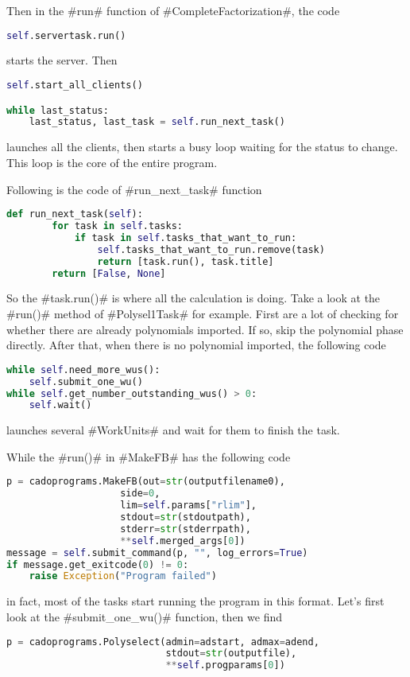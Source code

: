 \documentclass[a4paper]{article}
\begin{document}
Then in the #run# function of #CompleteFactorization#,
the code
\begin{lstlisting}[language=python]
self.servertask.run()
\end{lstlisting}
starts the server.
Then
\begin{lstlisting}[language=python]
self.start_all_clients()

while last_status:
    last_status, last_task = self.run_next_task()
\end{lstlisting}
launches all the clients, then starts a busy loop waiting for the status to change.
This loop is the core of the entire program.

Following is the code of #run_next_task# function
\begin{lstlisting}[language=python]
    def run_next_task(self):
        for task in self.tasks:
            if task in self.tasks_that_want_to_run:
                self.tasks_that_want_to_run.remove(task)
                return [task.run(), task.title]
        return [False, None]
\end{lstlisting}

So the #task.run()# is where all the calculation is doing.
Take a look at the #run()# method of #Polysel1Task# for example.
First are a lot of checking for whether there are already polynomials imported.
If so, skip the polynomial phase directly.
After that, when there is no polynomial imported, the following code
\begin{lstlisting}[language=python]
while self.need_more_wus():
    self.submit_one_wu()
while self.get_number_outstanding_wus() > 0:
    self.wait()
\end{lstlisting}
launches several #WorkUnits# and wait for them to finish the task.

While the #run()# in #MakeFB# has the following code
\begin{lstlisting}[language=python]
p = cadoprograms.MakeFB(out=str(outputfilename0),
                    side=0,
                    lim=self.params["rlim"],
                    stdout=str(stdoutpath),
                    stderr=str(stderrpath),
                    **self.merged_args[0])
message = self.submit_command(p, "", log_errors=True)
if message.get_exitcode(0) != 0:
    raise Exception("Program failed")
\end{lstlisting}
in fact, most of the tasks start running the program in this format.
Let's first look at the #submit_one_wu()# function, then we find
\begin{lstlisting}[language=python]
p = cadoprograms.Polyselect(admin=adstart, admax=adend,
                            stdout=str(outputfile),
                            **self.progparams[0])
\end{lstlisting}
\end{document}
